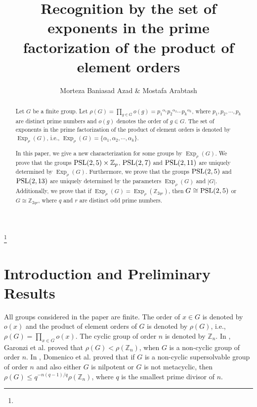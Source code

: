 \documentclass[12pt]{amsart}
\theoremstyle{definition}
\begin{document}
	\title[Recognition by the set of exponents]{Recognition by the set of exponents in the prime factorization of the product of element orders}
\author[M. Baniasad Azad \& M. Arabtash]{Morteza Baniasad Azad \& Mostafa Arabtash}
	\address{Abolfazl Street, 22 Bahman Blvd., Bardsir, Kerman 78416-64979, Iran \newline }
	\address{School of Information and Engineering, Dalarna University, Sweden\newline }
	
	\thanks{}
	
	
	\begin{abstract}
Let $G$ be a finite group. Let  $\rho(G) =  \prod_{g \in G} o(g)={p_1}^{\alpha_1}  {p_2}^{\alpha_2} \cdots  {p_k}^{\alpha_k}$, where $p_1, p_2, \cdots, p_k$ are distinct prime numbers and $o(g)$ denotes the order of $g \in G$. The set of exponents in the prime factorization of the product of element orders is denoted by $ {\operatorname{Exp}}_{\rho}(G)$, i.e., $ {\operatorname{Exp}}_{\rho}(G)=\{\alpha_1,\alpha_2, \cdots,\alpha_k\}$.
		 
In this paper, we give a new characterization for some groups by $ {\operatorname{Exp}}_{\rho}(G)$. We prove that the groups ${\rm PSL}(2, 5) \times \mathbb{Z}_p$, ${\rm PSL}(2, 7)$ and ${\rm PSL}(2, 11)$ are uniquely determined by $ {\operatorname{Exp}}_{\rho}(G)$. Furthermore, we prove that the groups ${\rm PSL}(2, 5)$ and ${\rm PSL}(2, 13)$ are uniquely determined by the  parameters $ {\operatorname{Exp}}_{\rho}(G)$ and $|G|$.
Additionally, we prove that 
if  ${\operatorname{Exp}}_{\rho}(G) =  {\operatorname{Exp}}_{\rho}(\mathbb{Z}_{2qr})$, then $G \cong {\rm PSL}(2, 5)$  or $G \cong \mathbb{Z}_{2qr}$,
	where  $q$ and $r$ are distinct  odd prime numbers. 
	\end{abstract}
	
	
	
	
	\maketitle
	\section{\bf Introduction and Preliminary Results}
	All groups considered in the paper are finite.
	The order of $x \in G$ is denoted by $o(x)$ and the product of element orders of $G$ is denoted by
	$\rho(G)$, i.e., $\rho(G)=\prod_{x \in G} o(x)$.
	The cyclic group of order $n$ is denoted by $\mathbb{Z}_n$.
In \cite{PatassinizbMATH06708963},  Garonzi et al. proved that $\rho(G)<\rho(\mathbb{Z}_n)$, when $G$ is a  non-cyclic group of order $n$.
In \cite[Theorem A]{noce}, Domenico et al. proved that if $G$ is
a non-cyclic supersolvable group of order $n$ 
 and also either $G$ is nilpotent or $G$ is not metacyclic, then
 $\rho(G) \leq q^{-n(q-1)/q} \rho(\mathbb{Z}_n)$,
where $q$ is the smallest prime divisor of $n$.
\end{document}
